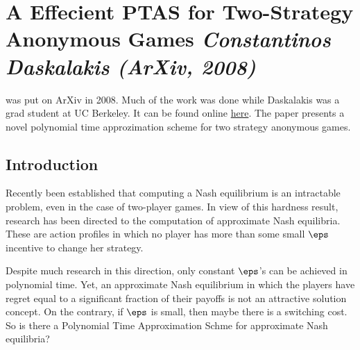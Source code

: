 
\newpage
\section{A Effecient PTAS for Two-Strategy Anonymous Games \textit{\small Constantinos Daskalakis (ArXiv, 2008)}}

\citet{D-2008} was put on ArXiv in 2008. Much of the work was done while Daskalakis was a grad student at UC Berkeley. It can be found online \href{https://arxiv.org/abs/0812.2277}{here}. The paper presents a novel polynomial time approzimation scheme for two strategy anonymous games. 

\subsection{Introduction}

Recently been established that computing a Nash equilibrium is an intractable problem, even in the case of two-player games. In view of this hardness result, research has been directed to the computation of approximate Nash equilibria. These are action profiles in which no player has more than some small $\eps$ incentive to change her strategy. 

Despite much research in this direction, only constant $\eps$'s can be achieved in polynomial time. Yet, an approximate Nash equilibrium in which the players have regret equal to a significant fraction of their payoffs is not an attractive solution concept. On the contrary, if $\eps$ is small, then maybe there is a switching cost. So is there a Polynomial Time Approximation Schme for approximate Nash equilibria?

